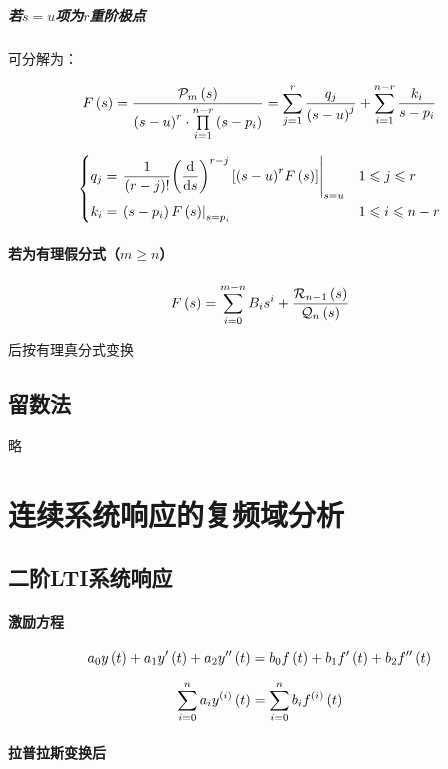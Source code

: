 \documentclass{article}
\begin{document}
\subparagraph{若$s=u$项为$r$重阶极点}

可分解为：

\[F\left(s\right)=\frac{\mathcal P_m\left(s\right)}{{\left(s-u\right)}^r\cdot\prod\limits_{i=1}^{n-r}\left(s-p_i\right)}
    =\sum_{j=1}^r\frac{q_j}{{\left(s-u\right)}^j}+\sum_{i=1}^{n-r}\frac{k_i}{s-p_i}\]

\[\left\{\begin{aligned}
        q_j & =\left.\frac1{\left(r-j\right)!}{\left(\frac{\mathrm d}{\mathrm d s}\right)}^{r-j}\left[{\left(s-u\right)}^rF\left(s\right)\right]\right|_{s=u} &  & 1\leqslant j\leqslant r   \\
        k_i & =\left.\left(s-p_i\right)F\left(s\right)\right|_{s=p_i}                                                             &  & 1\leqslant i\leqslant n-r
    \end{aligned}\right.\]

\paragraph{若为有理假分式（$m\geqslant n$）}

\[F\left(s\right)=\sum_{i=0}^{m-n}B_is^i+\frac{\mathcal R_{n-1}\left(s\right)}{\mathcal Q_n\left(s\right)}\]

后按有理真分式变换

\subsection{留数法}

略

\section{连续系统响应的复频域分析}

\subsection{二阶LTI系统响应}

\paragraph{激励方程}

\[a_0y\left(t\right)+a_1y^\prime\left(t\right)+a_2y^{\prime\prime}\left(t\right)
    =b_0f\left(t\right)+b_1f^\prime\left(t\right)+b_2f^{\prime\prime}\left(t\right)\]

\[\sum_{i=0}^na_iy^{\left(i\right)}\left(t\right)
    =\sum_{i=0}^nb_if^{\left(i\right)}\left(t\right)\]

\paragraph{拉普拉斯变换后}
\end{document}
